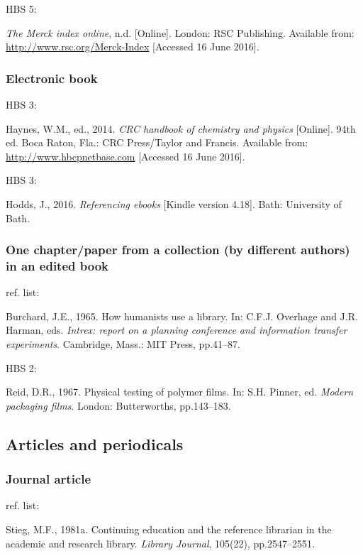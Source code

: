 HBS 5: \cite{merckNDidx}

\emph{The Merck index online}, n.d. [Online]. London: RSC Publishing. Available from: \url{http://www.rsc.org/Merck-Index} [Accessed 16 June 2016].



\subsubsection*{Electronic book}

HBS 3: \cite{haynes2014crc}

Haynes, W.M., ed., 2014. \emph{CRC handbook of chemistry and physics} [Online]. 94th ed. Boca Raton, Fla.: CRC Press/Taylor and Francis. Available from: \url{http://www.hbcpnetbase.com} [Accessed 16 June 2016].


HBS 3: \cite{hodds2016re}

Hodds, J., 2016. \emph{Referencing ebooks} [Kindle version 4.18]. Bath: University of Bath.



\subsubsection*{One chapter\slash paper from a collection (by different authors) in an edited book}

ref. list: \cite{burchard1965hhl}

Burchard, J.E., 1965. How humanists use a library. In: C.F.J. Overhage and J.R. Harman, eds. \emph{Intrex: report on a planning conference and information transfer experiments}. Cambridge, Mass.: MIT Press, pp.41--87.


HBS 2: \cite{reid1967ptp}

Reid, D.R., 1967. Physical testing of polymer films. In: S.H. Pinner, ed. \emph{Modern packaging films}. London: Butterworths, pp.143--183.



\subsection{Articles and periodicals}

\subsubsection*{Journal article}

ref. list: \cite{stieg1981cer}

Stieg, M.F., 1981a. Continuing education and the reference librarian in the academic and research library. \emph{Library Journal}, 105(22), pp.2547--2551.


